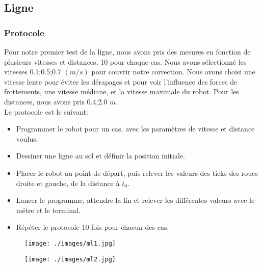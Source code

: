 \documentclass[10pt,a4paper]{article}
\begin{document}
\subsection{Ligne}

\subsubsection{Protocole}
Pour notre premier test de la ligne, nous avons pris des mesures en fonction de plusieurs vitesses et distances, 10 pour chaque cas.
Nous avons sélectionné les vitesses {0.1;0.5;0.7} $(m/s)$ pour couvrir notre correction. Nous avons choisi une vitesse lente pour éviter les dérapages et pour voir l'influence des forces de frottements, une vitesse médiane, et la vitesse maximale du robot. Pour les distances, nous avons pris {0.4;2.0} $m$.\\
Le protocole est le suivant:\\
\begin{itemize}
\item Programmer le robot pour un cas, avec les paramètres de vitesse et distance voulus. \\
\item Dessiner une ligne au sol et définir la position initiale.\\
\item Placer le robot au point de départ, puis relever les valeurs des ticks des roues droite et gauche, de la distance à $t_0$.\\
\item Lancer le programme, attendre la fin et relever les différentes valeurs avec le métre et le terminal.\\
\item Répéter le protocole 10 fois pour chacun des cas.\\
\end{itemize}
\vspace{5mm}

\begin{figure}[h]
    \begin{minipage}[c]{.46\linewidth}
        \centering
        \texttt{[image: ./images/ml1.jpg]}
    \end{minipage}
    \hfill%
    \begin{minipage}[c]{.46\linewidth}
        \centering
        \texttt{[image: ./images/ml2.jpg]}
    \end{minipage}
\end{figure}
\end{document}
